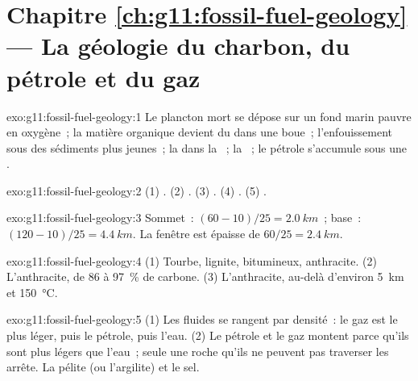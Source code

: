 \section*{Chapitre \ref{ch:g11:fossil-fuel-geology} --- La géologie du charbon, du pétrole et du gaz}

\begin{solution}{exo:g11:fossil-fuel-geology:1}
Le plancton mort se dépose sur un fond marin pauvre en oxygène~; la
matière organique devient du  dans une boue~; l'enfouissement sous
des sédiments plus jeunes~; la  dans la ~; la
~; le pétrole s'accumule sous une .
\end{solution}

\begin{solution}{exo:g11:fossil-fuel-geology:2}
(1) . (2) . (3) . (4) .
(5) .
\end{solution}

\begin{solution}{exo:g11:fossil-fuel-geology:3}
Sommet~: $(60 - 10)/25 = \qty{2.0}{km}$~; base~:
$(120 - 10)/25 = \qty{4.4}{km}$. La fenêtre est épaisse de
$60/25 = \qty{2.4}{km}$.
\end{solution}

\begin{solution}{exo:g11:fossil-fuel-geology:4}
(1) Tourbe, lignite,  bitumineux, anthracite. (2) L'anthracite, de
86 à \qty{97}{\percent} de carbone. (3) L'anthracite, au-delà d'environ
\qty{5}{km} et \qty{150}{\degreeCelsius}.
\end{solution}

\begin{solution}{exo:g11:fossil-fuel-geology:5}
(1) Les fluides se rangent par densité~: le gaz est le plus léger, puis le
pétrole, puis l'eau. (2) Le pétrole et le gaz montent parce qu'ils sont plus
légers que l'eau~; seule une roche qu'ils ne peuvent pas traverser les
arrête. La pélite (ou l'argilite) et le sel.
\end{solution}

